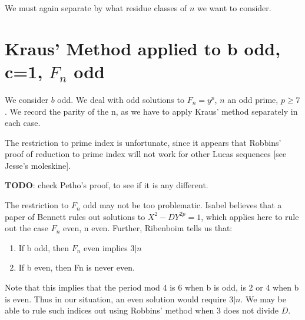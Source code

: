 \documentclass[12pt]{article}
\begin{document}
\begin{enumerate}
We must again separate by what residue classes of $n$ we want to consider.  






















\end{enumerate}


\section{Kraus' Method applied to b odd, c=1, $F_n$ odd}
We consider $b$ odd.
We deal with odd solutions to $F_n = y^p$, $n$ an odd prime, $p \geq 7$. We record the parity of the n, as we have to apply Kraus' method separately in each case.

The restriction to prime index is unfortunate, since it appears that Robbins' proof of reduction to prime index will not work for other Lucas sequences [see Jesse's moleskine]. 

\textbf{TODO}: check Petho's proof, to see if it is any different.

The restriction to $F_n$ odd may not be too problematic. Isabel believes that a paper of Bennett rules out solutions to $X^2-DY^{2p}=1$, which applies here to rule out the case $F_n$ even, n even. Further, Ribenboim tells us that:
\begin{enumerate}
\item If b odd, then $F_n$ even implies $3 | n$
\item If b even, then Fn is never even.
\end{enumerate}
Note that this implies that the period mod 4 is 6 when b is odd, is 2 or 4 when b is even. Thus in our situation, an even solution would require $3|n$. We may be able to rule such indices out using Robbins' method when 3 does not divide $D$.
\end{document}
